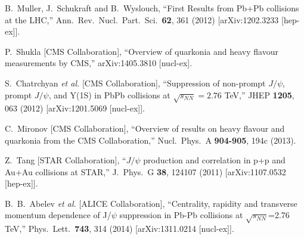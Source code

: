 \documentclass[aps,prc,preprint,superscriptaddress,showpacs,showkeys]{revtex4-1}
\begin{document}
\begin{thebibliography}{100}

  B.~Muller, J.~Schukraft and B.~Wyslouch,
  ``First Results from Pb+Pb collisions at the LHC,''
  Ann.\ Rev.\ Nucl.\ Part.\ Sci.\  {\bf 62}, 361 (2012)
  [arXiv:1202.3233 [hep-ex]].

  P.~Shukla [CMS Collaboration],
  ``Overview of quarkonia and heavy flavour measurements by CMS,''
  arXiv:1405.3810 [nucl-ex].

  S.~Chatrchyan {\it et al.}  [CMS Collaboration],
  ``Suppression of non-prompt $J/\psi$, prompt $J/\psi$, and Y(1S) in PbPb collisions at $\sqrt{s_{NN}}=2.76$ TeV,''
  JHEP {\bf 1205}, 063 (2012)
  [arXiv:1201.5069 [nucl-ex]].


  C.~Mironov [CMS Collaboration],
  ``Overview of results on heavy flavour and quarkonia from the CMS Collaboration,''
  Nucl.\ Phys.\ A {\bf 904-905}, 194c (2013).

  Z.~Tang [STAR Collaboration],
  ``$J/\psi$ production and correlation in p+p and Au+Au collisions at STAR,''
  J.\ Phys.\ G {\bf 38}, 124107 (2011)
  [arXiv:1107.0532 [hep-ex]].

  B.~B.~Abelev {\it et al.}  [ALICE Collaboration],
  ``Centrality, rapidity and transverse momentum dependence of J/$\psi$ suppression in Pb-Pb collisions at $\sqrt{s_{NN}}$=2.76 TeV,''
  Phys.\ Lett.\  {\bf 743}, 314 (2014)
  [arXiv:1311.0214 [nucl-ex]].


\end{thebibliography}
\end{document}
